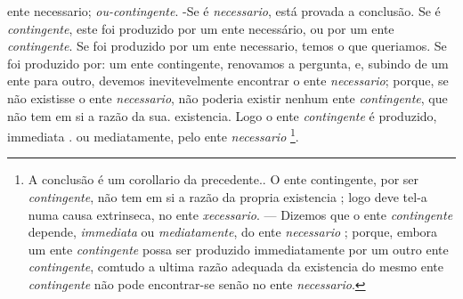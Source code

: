 ente necessario; \emph{ou-contingente}. -Se é \emph{necessario}, está provada a conclusão. Se é \emph{contingente}, este foi produzido por um ente necessário, ou por um ente \emph{contingente}. Se foi produzido por um ente necessario, temos o que queriamos. Se foi produzido por: um ente contingente, renovamos a pergunta, e, subindo de um ente para outro, devemos inevitevelmente encontrar o ente \emph{necessario}; porque, se não existisse o ente \emph{necessario}, não poderia existir nenhum ente \emph{contingente}, que não tem em si a razão da sua. existencia. Logo o ente \emph{contingente} é produzido, immediata . ou mediatamente, pelo ente \emph{necessario} \footnote{A conclusão é um corollario da precedente.. O ente contingente, por ser \emph{contingente}, não tem em si a razão da propria existencia ; logo deve tel-a numa causa extrinseca, no ente \emph{xecessario}. --- Dizemos que o ente \emph{contingente} depende, \emph{immediata} ou \emph{mediatamente}, do ente \emph{necessario} ; porque, embora um ente \emph{contingente} possa ser produzido immediatamente por um outro ente \emph{contingente}, comtudo a ultima razão adequada da existencia do mesmo ente \emph{contingente} não pode encontrar-se senão no ente \emph{necessario}.}.

